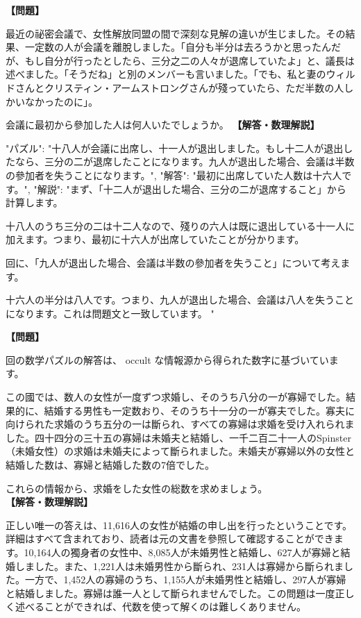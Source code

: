 \documentclass[10pt,a4paper,oneside,openany]{ltjsbook}
\begin{document}
\begin{tcolorbox}[colback=softblue,colframe=primaryblue,title=\textbf{第 107 問：THE SUFFRAGISTS' MEETING.},arc=2mm,boxrule=1pt,breakable]
\textbf{【問題】}\par\vspace{0.3em}
最近の祕密会議で、女性解放同盟の間で深刻な見解の違いが生じました。その結果、一定数の人が会議を離脫しました。「自分も半分は去ろうかと思ったんだが、もし自分が行ったとしたら、三分之二の人々が退席していたよ」と、議長は述べました。「そうだね」と別のメンバーも言いました。「でも、私と妻のウィルドさんとクリスティン・アームストロングさんが殘っていたら、ただ半数の人しかいなかったのに」。

会議に最初から參加した人は何人いたでしょうか。
\tcblower
\textbf{【解答・数理解説】}\par\vspace{0.3em}
{
"パズル": "十八人が会議に出席し、十一人が退出しました。もし十二人が退出したなら、三分の二が退席したことになります。九人が退出した場合、会議は半数の參加者を失うことになります。",
"解答": "最初に出席していた人数は十六人です。",
"解説": "まず、「十二人が退出した場合、三分の二が退席すること」から計算します。

十八人のうち三分の二は十二人なので、殘りの六人は既に退出している十一人に加えます。つまり、最初に十六人が出席していたことが分かります。

回に、「九人が退出した場合、会議は半数の參加者を失うこと」について考えます。

十六人の半分は八人です。つまり、九人が退出した場合、会議は八人を失うことになります。これは問題文と一致しています。
"
}
\end{tcolorbox}

\begin{tcolorbox}[colback=softblue,colframe=primaryblue,title=\textbf{第 108 問：THE LEAP-YEAR LADIES.},arc=2mm,boxrule=1pt,breakable]
\textbf{【問題】}\par\vspace{0.3em}
回の数学パズルの解答は、 occult な情報源から得られた数字に基づいています。

この國では、数人の女性が一度ずつ求婚し、そのうち八分の一が寡婦でした。結果的に、結婚する男性も一定数おり、そのうち十一分の一が寡夫でした。寡夫に向けられた求婚のうち五分の一は斷られ、すべての寡婦は求婚を受け入れられました。四十四分の三十五の寡婦は未婚夫と結婚し、一千二百二十一人のSpinster（未婚女性）の求婚は未婚夫によって斷られました。未婚夫が寡婦以外の女性と結婚した数は、寡婦と結婚した数の7倍でした。

これらの情報から、求婚をした女性の総数を求めましょう。
\tcblower
\textbf{【解答・数理解説】}\par\vspace{0.3em}
正しい唯一の答えは、11,616人の女性が結婚の申し出を行ったということです。詳細はすべて含まれており、読者は元の文書を參照して確認することができます。10,164人の獨身者の女性中、8,085人が未婚男性と結婚し、627人が寡婦と結婚しました。また、1,221人は未婚男性から斷られ、231人は寡婦から斷られました。一方で、1,452人の寡婦のうち、1,155人が未婚男性と結婚し、297人が寡婦と結婚しました。寡婦は誰一人として斷られませんでした。この問題は一度正しく述べることができれば、代数を使って解くのは難しくありません。
\end{tcolorbox}
\end{document}
